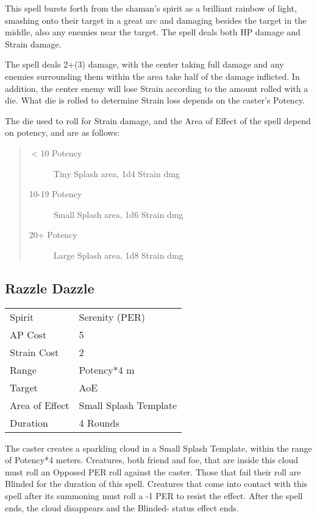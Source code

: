 \documentclass[11pt,a4paper,twocolumn]{book}
\begin{document}
\medskip

This spell bursts forth from the shaman's spirit as a brilliant rainbow of light, smashing onto their target in a great arc and damaging besides the target in the middle, also any enemies near the target. The spell deals both HP damage and Strain damage.

The spell deals 2+(3) damage, with the center taking full damage and any enemies surrounding them within the area take half of the damage inflicted. In addition, the center enemy will lose Strain according to the amount rolled with a die. What die is rolled to determine Strain loss depends on the caster's Potency.

The die used to roll for Strain damage, and the Area of Effect of the spell depend on potency, and are as follows:

\begin{quote}
	\begin{description}
		\item[$<$10 Potency] 	Tiny Splash area, 1d4 Strain dmg
		\item[10-19 Potency] 	Small Splash area, 1d6 Strain dmg
		\item[20+ Potency] 		Large Splash area, 1d8 Strain dmg
	\end{description}	
\end{quote}


\subsection*{Razzle Dazzle}
{
	\begin{tabu} to 70mm{| X[l,4] | X[l,7] |}
		\hline
		Spirit         & Serenity (PER)        \\
		AP Cost        & 5                     \\
		Strain Cost    & 2                     \\
		Range          & Potency*4 m           \\
		Target         & AoE                   \\
		Area of Effect & Small Splash Template \\
		Duration       & 4 Rounds              \\ \hline
	\end{tabu}
	
}
\medskip

The caster creates a sparkling cloud in a Small Splash Template, within the range of Potency*4 meters. Creatures, both friend and foe, that are inside this cloud must roll an Opposed PER roll against the caster. Those that fail their roll are Blinded for the duration of this spell. Creatures that come into contact with this spell after its summoning must roll a -1 PER to resist the effect. After the spell ends, the cloud disappears and the Blinded- status effect ends.
\end{document}
